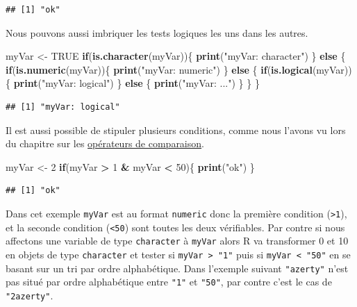 \documentclass[]{book}
\newenvironment{Shaded}{\begin{snugshade}}{\end{snugshade}}
\newcommand{\ControlFlowTok}[1]{\textcolor[rgb]{0.13,0.29,0.53}{\textbf{#1}}}
\newcommand{\DecValTok}[1]{\textcolor[rgb]{0.00,0.00,0.81}{#1}}
\newcommand{\KeywordTok}[1]{\textcolor[rgb]{0.13,0.29,0.53}{\textbf{#1}}}
\newcommand{\NormalTok}[1]{#1}
\newcommand{\OperatorTok}[1]{\textcolor[rgb]{0.81,0.36,0.00}{\textbf{#1}}}
\newcommand{\OtherTok}[1]{\textcolor[rgb]{0.56,0.35,0.01}{#1}}
\newcommand{\StringTok}[1]{\textcolor[rgb]{0.31,0.60,0.02}{#1}}
\begin{document}
\begin{verbatim}
## [1] "ok"
\end{verbatim}

Nous pouvons aussi imbriquer les tests logiques les uns dans les autres.

\begin{Shaded}
\begin{Highlighting}[]
\NormalTok{myVar <-}\StringTok{ }\OtherTok{TRUE}
\ControlFlowTok{if}\NormalTok{(}\KeywordTok{is.character}\NormalTok{(myVar))\{}
  \KeywordTok{print}\NormalTok{(}\StringTok{"myVar: character"}\NormalTok{)}
\NormalTok{\} }\ControlFlowTok{else}\NormalTok{ \{}
  \ControlFlowTok{if}\NormalTok{(}\KeywordTok{is.numeric}\NormalTok{(myVar))\{}
    \KeywordTok{print}\NormalTok{(}\StringTok{"myVar: numeric"}\NormalTok{)}
\NormalTok{  \} }\ControlFlowTok{else}\NormalTok{ \{}
    \ControlFlowTok{if}\NormalTok{(}\KeywordTok{is.logical}\NormalTok{(myVar))\{}
      \KeywordTok{print}\NormalTok{(}\StringTok{"myVar: logical"}\NormalTok{)}
\NormalTok{    \} }\ControlFlowTok{else}\NormalTok{ \{}
      \KeywordTok{print}\NormalTok{(}\StringTok{"myVar: ..."}\NormalTok{)}
\NormalTok{    \}}
\NormalTok{  \}}
\NormalTok{\}}
\end{Highlighting}
\end{Shaded}

\begin{verbatim}
## [1] "myVar: logical"
\end{verbatim}

Il est aussi possible de stipuler plusieurs conditions, comme nous l'avons vu lors du chapitre sur les \protect\hyperlink{l011opcomp}{opérateurs de comparaison}.

\begin{Shaded}
\begin{Highlighting}[]
\NormalTok{myVar <-}\StringTok{ }\DecValTok{2}
\ControlFlowTok{if}\NormalTok{(myVar }\OperatorTok{>}\StringTok{ }\DecValTok{1} \OperatorTok{&}\StringTok{ }\NormalTok{myVar }\OperatorTok{<}\StringTok{ }\DecValTok{50}\NormalTok{)\{}
  \KeywordTok{print}\NormalTok{(}\StringTok{"ok"}\NormalTok{)}
\NormalTok{\}}
\end{Highlighting}
\end{Shaded}

\begin{verbatim}
## [1] "ok"
\end{verbatim}

Dans cet exemple \texttt{myVar} est au format \texttt{numeric} donc la première condition (\texttt{\textgreater{}1}), et la seconde condition (\texttt{\textless{}50}) sont toutes les deux vérifiables. Par contre si nous affectons une variable de type \texttt{character} à \texttt{myVar} alors R va transformer 0 et 10 en objets de type \texttt{character} et tester si \texttt{myVar\ \textgreater{}\ "1"} puis si \texttt{myVar\ \textless{}\ "50"} en se basant sur un tri par ordre alphabétique. Dans l'exemple suivant \texttt{"azerty"} n'est pas situé par ordre alphabétique entre \texttt{"1"} et \texttt{"50"}, par contre c'est le cas de \texttt{"2azerty"}.
\end{document}
